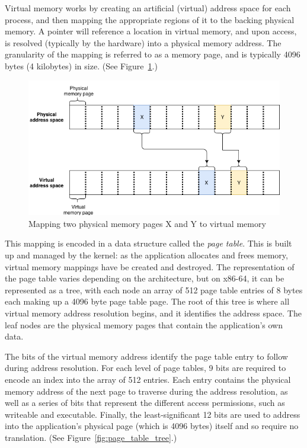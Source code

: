 Virtual memory works by creating an artificial (virtual) address space for each process, and then mapping the appropriate regions of it to the backing physical memory. A pointer will reference a location in virtual memory, and upon access, is resolved (typically by the hardware) into a physical memory address. The granularity of the mapping is referred to as a memory page, and is typically 4096 bytes (4 kilobytes) in size. (See Figure~\ref{fig:virtual_memory}.)

\begin{figure}
	\centering
	\includegraphics[width=\textwidth]{diagrams/virtual_memory.png}
	\caption{Mapping two physical memory pages X and Y to virtual memory}
	\label{fig:virtual_memory}
\end{figure}

This mapping is encoded in a data structure called the \emph{page table}. This is built up and managed by the kernel: as the application allocates and frees memory, virtual memory mappings have be created and destroyed. The representation of the page table varies depending on the architecture, but on x86-64, it can be represented as a tree, with each node an array of 512 page table entries of 8 bytes each making up a 4096 byte page table page. The root of this tree is where all virtual memory address resolution begins, and it identifies the address space. The leaf nodes are the physical memory pages that contain the application's own data.

The bits of the virtual memory address identify the page table entry to follow during address resolution. For each level of page tables, 9 bits are required to encode an index into the array of 512 entries. Each entry contains the physical memory address of the next page to traverse during the address resolution, as well as a series of bits that represent the different access permissions, such as writeable and executable. Finally, the least-significant 12 bits are used to address into the application's physical page (which is 4096 bytes) itself and so require no translation. (See Figure~\ref{fig:page_table_tree}.)

